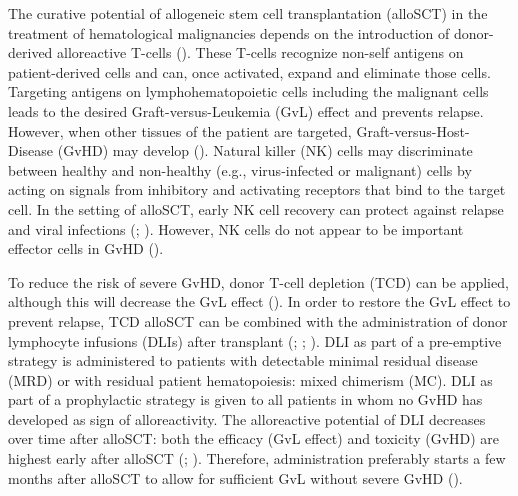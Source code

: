 \documentclass[
  letterpaper,
  paper=240mm:170mm,
  twoside=true,
  open=right,
  fontsize=10pt,
  pagesize=false,
  BCOR=15mm,
  DIV=14,
  headinclude=true,
  footinclude=false,
  headsepline=on]{scrbook}
\begin{document}
The curative potential of allogeneic stem cell transplantation (alloSCT)
in the treatment of hematological malignancies depends on the
introduction of donor-derived alloreactive T-cells
(). These T-cells recognize non-self antigens on
patient-derived cells and can, once activated, expand and eliminate
those cells. Targeting antigens on lymphohematopoietic cells including
the malignant cells leads to the desired Graft-versus-Leukemia (GvL)
effect and prevents relapse. However, when other tissues of the patient
are targeted, Graft-versus-Host-Disease (GvHD) may develop
(). Natural killer (NK) cells may discriminate between healthy and
non-healthy (e.g., virus-infected or malignant) cells by acting on
signals from inhibitory and activating receptors that bind to the target
cell. In the setting of alloSCT, early NK cell recovery can protect
against relapse and viral infections
(; ). However, NK cells do not appear to be important
effector cells in GvHD
().

To reduce the risk of severe GvHD, donor T-cell depletion (TCD) can be
applied, although this will decrease the GvL effect
(). In
order to restore the GvL effect to prevent relapse, TCD alloSCT can be
combined with the administration of donor lymphocyte infusions (DLIs)
after transplant
(;
; ). DLI as part of a pre-emptive strategy is
administered to patients with detectable minimal residual disease (MRD)
or with residual patient hematopoiesis: mixed chimerism (MC). DLI as
part of a prophylactic strategy is given to all patients in whom no GvHD
has developed as sign of alloreactivity. The alloreactive potential of
DLI decreases over time after alloSCT: both the efficacy (GvL effect)
and toxicity (GvHD) are highest early after alloSCT
(; ). Therefore, administration preferably starts a few months
after alloSCT to allow for sufficient GvL without severe GvHD
().
\end{document}

